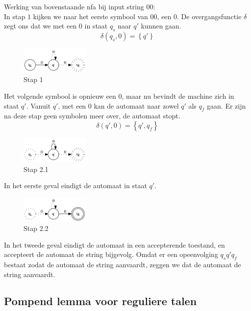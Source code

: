 \documentclass[main.tex]{subfiles}
\begin{document}
\begin{vb}
  Werking van bovenstaande nfa bij input string $00$:\\
  In stap $1$ kijken we naar het eerste symbool van $00$, een $0$.
  De overgangsfunctie $\delta$ zegt ons dat we met een $0$ in staat $q_{s}$ naar $q'$ kunnen gaan.
  \[ \delta(q_{s},0) = \left\{q'\right\} \]
  \begin{figure}[H]
    \centering
    \includegraphics[width=0.3\textwidth]{assets/nfa-vb2.png}
    \caption{Stap 1}
    \label{fig:nfa-vb2}
  \end{figure}
  Het volgende symbool is opnieuw een $0$, maar nu bevindt de machine zich in staat $q'$.
  Vanuit $q'$, met een $0$ kan de automaat naar zowel $q'$ als $q_{f}$ gaan.
  Er zijn na deze stap geen symbolen meer over, de automaat stopt.
  \[ \delta(q',0) = \left\{q',q_{f}\right\} \]
  \begin{figure}[H]
    \centering
    \includegraphics[width=0.3\textwidth]{assets/nfa-vb3.png}
    \caption{Stap 2.1}
    \label{fig:nfa-vb3}
  \end{figure}
  In het eerste geval eindigt de automaat in staat $q'$.
  \begin{figure}[H]
    \centering
    \includegraphics[width=0.3\textwidth]{assets/nfa-vb4.png}
    \caption{Stap 2.2}
    \label{fig:nfa-vb4}
  \end{figure}
  In het tweede geval eindigt de automaat in een accepterende toestand, en accepteert de automaat de string bijgevolg.
  Omdat er een opeenvolging $q_{s}q'q_{f}$ bestaat zodat de automaat de string aanvaardt, zeggen we dat de automaat de string aanvaardt.
\end{vb}


\subsection{Pompend lemma voor reguliere talen}
\label{sec:pompend-lemma-voor-reguliere-talen}
\end{document}
